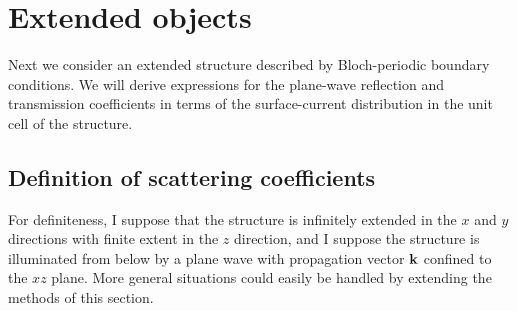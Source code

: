 \documentclass[letterpaper]{article}
\begin{document}
\section{Extended objects}

Next we consider an extended structure described by Bloch-periodic
boundary conditions. We will derive expressions for the 
plane-wave reflection and transmission coefficients in terms
of the surface-current distribution in the unit cell of the structure.

\subsection*{Definition of scattering coefficients}

For definiteness, I suppose that the structure is infinitely 
extended in the $x$ and $y$ directions with finite extent in
the $z$ direction, and I suppose the structure is illuminated 
from below by a plane wave with propagation vector $\mathbf{k}$ 
confined to the $xz$ plane. More general situations could easily be 
handled by extending the methods of this section.
\end{document}
